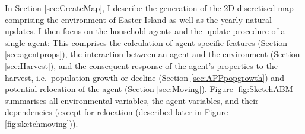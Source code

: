 
In Section \ref{sec:CreateMap}, I describe the generation of the 2D discretised map comprising the environment of Easter Island as well as the yearly natural updates. I then focus on the household agents and the update procedure of a single agent:
This comprises the calculation of agent specific features (Section \ref{sec:agentprops}), the interaction between an agent and the environment (Section \ref{sec:Harvest}), and the consequent response of the agent's properties to the harvest, i.e.\ population growth or decline (Section \ref{sec:APPpopgrowth}) and potential relocation of the agent (Section \ref{sec:Moving}).
Figure \ref{fig:SketchABM} summarises all environmental variables, the agent variables, and their dependencies (except for relocation (described later in Figure \ref{fig:sketchmoving})).

